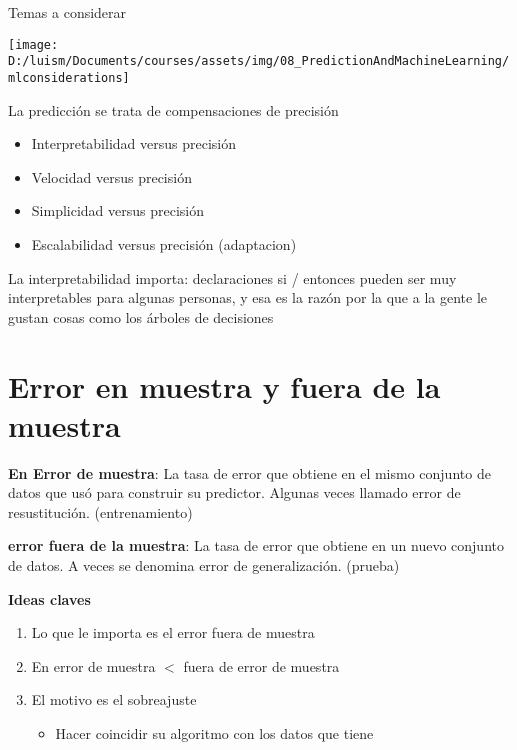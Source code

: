 \documentclass[
]{article}
\providecommand{\tightlist}{%
  \setlength{\itemsep}{0pt}\setlength{\parskip}{0pt}}
\begin{document}
Temas a considerar

\begin{center}\texttt{[image: D:/luism/Documents/courses/assets/img/08\_PredictionAndMachineLearning/mlconsiderations]} \end{center}

La predicción se trata de compensaciones de precisión

\begin{itemize}
\tightlist
\item
  Interpretabilidad versus precisión
\item
  Velocidad versus precisión
\item
  Simplicidad versus precisión
\item
  Escalabilidad versus precisión (adaptacion)
\end{itemize}

La interpretabilidad importa: declaraciones si / entonces pueden ser muy
interpretables para algunas personas, y esa es la razón por la que a la
gente le gustan cosas como los árboles de decisiones

\hypertarget{error-en-muestra-y-fuera-de-la-muestra}{%
\section{Error en muestra y fuera de la
muestra}\label{error-en-muestra-y-fuera-de-la-muestra}}

\textbf{En Error de muestra}: La tasa de error que obtiene en el mismo
conjunto de datos que usó para construir su predictor. Algunas veces
llamado error de resustitución. (entrenamiento)

\textbf{error fuera de la muestra}: La tasa de error que obtiene en un
nuevo conjunto de datos. A veces se denomina error de generalización.
(prueba)

\textbf{Ideas claves}

\begin{enumerate}
\def\labelenumi{\arabic{enumi}.}
\tightlist
\item
  Lo que le importa es el error fuera de muestra
\item
  En error de muestra \(<\) fuera de error de muestra
\item
  El motivo es el sobreajuste

  \begin{itemize}
  \tightlist
  \item
    Hacer coincidir su algoritmo con los datos que tiene
  \end{itemize}
\end{enumerate}
\end{document}
